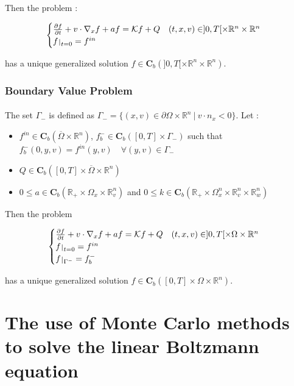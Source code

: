 \documentclass[a4paper, 11pt]{article}
\def\restriction#1#2{\mathchoice
	{\setbox1\hbox{${\displaystyle #1}_{\scriptstyle #2}$}
		\restrictionaux{#1}{#2}}
	{\setbox1\hbox{${\textstyle #1}_{\scriptstyle #2}$}
		\restrictionaux{#1}{#2}}
	{\setbox1\hbox{${\scriptstyle #1}_{\scriptscriptstyle #2}$}
		\restrictionaux{#1}{#2}}
	{\setbox1\hbox{${\scriptscriptstyle #1}_{\scriptscriptstyle #2}$}
		\restrictionaux{#1}{#2}}}
\def\restrictionaux#1#2{{#1\,\smash{\vrule height .8\ht1 depth .85\dp1}}_{\,#2}}
\begin{document}
Then the problem :

\[
\begin{cases}
\frac{\partial f}{\partial t}+v \cdot \nabla_x f +af =   \mathcal{K} f +Q \quad (t,x,v) \in ]0,T[ \times \mathbb{R}^n \times \mathbb{R}^n\\
\restriction{f}{t=0}= f^{in}
\end{cases}
\]

has a unique generalized solution $f \in \mathbf{C}_b(]0,T[ \times \mathbb{R}^n \times \mathbb{R}^n)$.

\subsubsection{Boundary Value Problem}

\paragraph{}
The set $\Gamma_-$ is defined as $\Gamma_-= \{(x,v) \in \partial \Omega \times \mathbb{R}^n ~ | ~ v\cdot n_x<0\}$. Let :
\begin{itemize}
	\item $f^{in} \in \mathbf{C}_b(\overline{\Omega} \times \mathbb{R}^n)$, $f_b^- \in \mathbf{C}_b([0,T] \times \Gamma_-)$ such that $f_b^-(0,y,v)=f^{in}(y,v) \quad \forall (y,v) \in \Gamma_-$
	\item $Q \in \mathbf{C}_b([0,T] \times \overline{\Omega} \times \mathbb{R}^n)$
	\item $0 \leq a \in \mathbf{C}_b(\mathbb{R}_+ \times \Omega_x \times \mathbb{R}_v^n)$ and $0 \leq k \in \mathbf{C}_b(\mathbb{R}_+ \times \Omega_x^n \times \mathbb{R}_v^n \times \mathbb{R}_w^n)$
\end{itemize}

Then the problem

\[
\begin{cases}
\frac{\partial f}{\partial t}+v \cdot \nabla_x f +af =   \mathcal{K} f +Q \quad (t,x,v) \in ]0,T[ \times \Omega \times \mathbb{R}^n\\
\restriction{f}{t=0}= f^{in}\\
\restriction{f}{\Gamma^-}=f_b^-
\end{cases}
\]

has a unique generalized solution $f \in \mathbf{C}_b([0,T] \times \Omega \times \mathbb{R}^n)$.

\section{The use of Monte Carlo methods to solve the linear Boltzmann equation}
\end{document}
